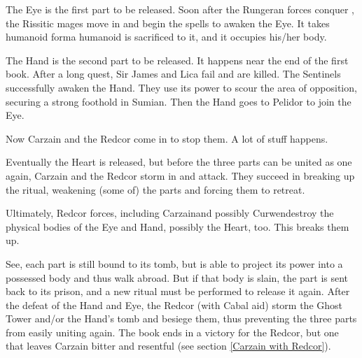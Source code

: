 \begin{garbage}
The Eye is the first part to be released. Soon after the Rungeran forces conquer \Forklin, the Rissitic mages move in and begin the spells to awaken the Eye. It takes humanoid form\dash a humanoid is sacrificed to it, and it occupies his/her body. 

The Hand is the second part to be released. It happens near the end of the first book. After a long quest, Sir James and Lica fail and are killed. The Sentinels successfully awaken the Hand. They use its power to scour the area of opposition, securing a strong foothold in Sumian. Then the Hand goes to Pelidor to join the Eye. 

Now Carzain and the Redcor come in to stop them. A lot of stuff happens. 


Eventually the Heart is released, but before the three parts can be united as one again, Carzain and the Redcor storm in and attack. They succeed in breaking up the ritual, weakening (some of) the \Haskelek{} parts and forcing them to retreat.

Ultimately, Redcor forces, including Carzain\dash and possibly Curwen\dash destroy the physical bodies of the Eye and Hand, possibly the Heart, too. This breaks them up.

See, each part is still bound to its tomb, but is able to project its power into a possessed body and thus walk abroad. But if that body is slain, the \Haskelek{} part is sent back to its prison, and a new ritual must be performed to release it again. After the defeat of the Hand and Eye, the Redcor (with Cabal aid) storm the Ghost Tower and/or the Hand's tomb and besiege them, thus preventing the three parts from easily uniting again. The book ends in a victory for the Redcor, but one that leaves Carzain bitter and resentful (see section \ref{Carzain with Redcor}). 
















\end{garbage}
